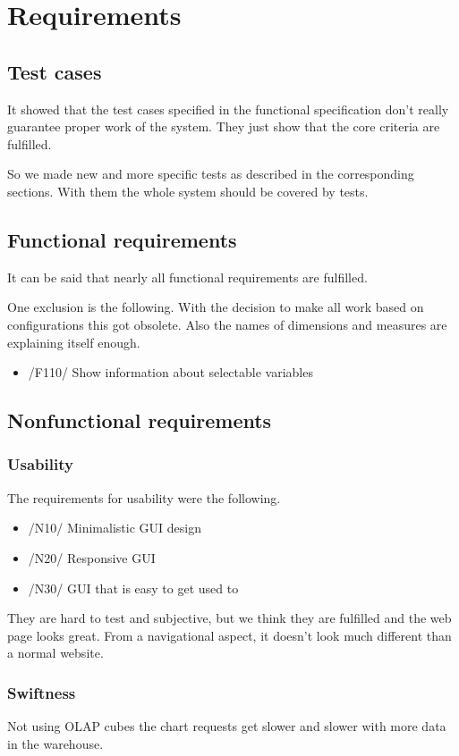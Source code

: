 \section{Requirements}\label{spec}


\subsection{Test cases}
It showed that the test cases specified in the functional specification
don't really guarantee proper work of the system. They just show
that the core criteria are fulfilled. 

So we made new and more specific tests as described in the
corresponding sections. With them the whole system should be covered by tests.

\subsection{Functional requirements}
It can be said that nearly all functional requirements are fulfilled.

One exclusion is the following. With the decision to make all work 
based on configurations this got obsolete. Also the names of dimensions
and measures are explaining itself enough.
\begin{itemize}
  \item /F110/ Show information about selectable variables
\end{itemize}

\subsection{Nonfunctional requirements}
\subsubsection{Usability}
The requirements for usability were the following. 
\begin{itemize}
  \item /N10/ Minimalistic GUI design
  \item /N20/ Responsive GUI
  \item /N30/ GUI that is easy to get used to
\end{itemize}
They are hard to test and subjective, but we think they are fulfilled
and the web page looks great. From a navigational aspect, it doesn't look much
different than a normal website.


\subsubsection{Swiftness}
Not using OLAP cubes the chart requests get slower and slower
with more data in the warehouse.

